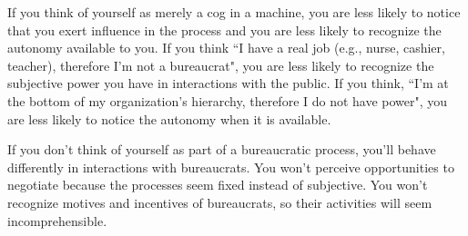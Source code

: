 If you think of yourself as merely a cog in a machine, you are less likely to notice that you exert influence in the process and you are less likely to recognize the autonomy available to you. 
If you think ``I have a real job (e.g., nurse, cashier, teacher), therefore I'm not a bureaucrat", you are less likely to recognize the subjective power you have in interactions with the public.
If you think, ``I'm at the bottom of my organization's hierarchy, therefore I do not have power", you are less likely to notice the autonomy when it is available.

If you don't think of yourself as part of a bureaucratic process, you'll behave differently in interactions with bureaucrats.  You won't perceive opportunities to negotiate because the processes seem fixed instead of subjective. 
You won't recognize motives and incentives of bureaucrats, so their activities will seem incomprehensible.


